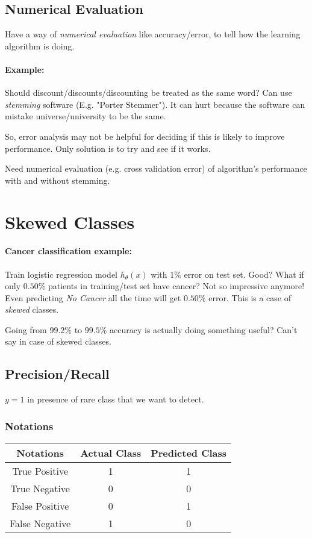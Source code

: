 \subsection{Numerical Evaluation}
Have a way of \emph{numerical evaluation} like accuracy/error, to tell how the learning
algorithm is doing.

\paragraph{Example:} Should discount/discounts/discounting be treated as the same word?
Can use \emph{stemming} software (E.g. "Porter Stemmer"). It can hurt because the software
can mistake universe/university to be the same.

So, error analysis may not be helpful for deciding if this is likely to improve performance.
Only solution is to try and see if it works.

Need numerical evaluation (e.g. cross validation error) of algorithm's performance
with and without stemming.

\section{Skewed Classes}
\paragraph{Cancer classification example:} Train logistic regression model $h_\theta(x)$
with $1\%$ error on test set. Good? What if only $0.50\%$ patients in training/test set
have cancer? Not so impressive anymore! Even predicting \emph{No Cancer} all the time
will get $0.50\%$ error. This is a case of \emph{skewed} classes.

Going from $99.2\%$ to $99.5\%$ accuracy is actually doing something useful? Can't say
in case of skewed classes.

\subsection{Precision/Recall}
$y = 1$ in presence of rare class that we want to detect.

\subsubsection{Notations}
\begin{tabular}{|c|c|c|}
	\hline
	Notations      & Actual Class & Predicted Class \\
	\hline
	True Positive  & 1            & 1               \\
	\hline
	True Negative  & 0            & 0               \\
	\hline
	False Positive & 0            & 1               \\
	\hline
	False Negative & 1            & 0               \\
	\hline
\end{tabular}

